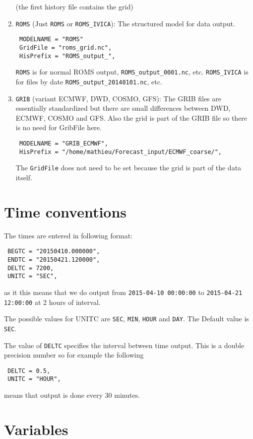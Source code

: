 \documentclass[12pt]{amsart}
\begin{document}
\begin{enumerate}
\begin{verbatim}
\end{verbatim}
(the first history file contains the grid)
\item {\tt ROMS} (Just {\tt ROMS} or {\tt ROMS\_IVICA}): The structured model for data output.
\begin{verbatim}
 MODELNAME = "ROMS"
 GridFile = "roms_grid.nc",
 HisPrefix = "ROMS_output_",
\end{verbatim}
{\tt ROMS} is for normal ROMS output, {\tt ROMS\_output\_0001.nc}, etc. {\tt ROMS\_IVICA} is for files by date {\tt ROMS\_output\_20140101.nc}, etc.
\item {\tt GRIB} (variant ECMWF, DWD, COSMO, GFS): The GRIB files are essentially standardized but there are small differences between DWD, ECMWF, COSMO and GFS. Also the grid is part of the GRIB file so there is no need for GribFile here.
\begin{verbatim}
 MODELNAME = "GRIB_ECMWF", 
 HisPrefix = "/home/mathieu/Forecast_input/ECMWF_coarse/", 
\end{verbatim}
The {\tt GridFile} does not need to be set because the grid is part of the data itself.
\end{enumerate}


\section{Time conventions}
The times are entered in following format:
\begin{verbatim}
 BEGTC = "20150410.000000",
 ENDTC = "20150421.120000",
 DELTC = 7200, 
 UNITC = "SEC", 
\end{verbatim}
as it this means that we do output from {\tt 2015-04-10 00:00:00} to {\tt 2015-04-21 12:00:00} at 2 hours of interval.

The possible values for UNITC are {\tt SEC}, {\tt MIN}, {\tt HOUR} and {\tt DAY}. The Default value is {\tt SEC}.

The value of {\tt DELTC} specifies the interval between time output. This is a double precision number so for example the following
\begin{verbatim}
 DELTC = 0.5, 
 UNITC = "HOUR", 
\end{verbatim}
means that output is done every $30$ minutes.


\section{Variables}
\end{document}
